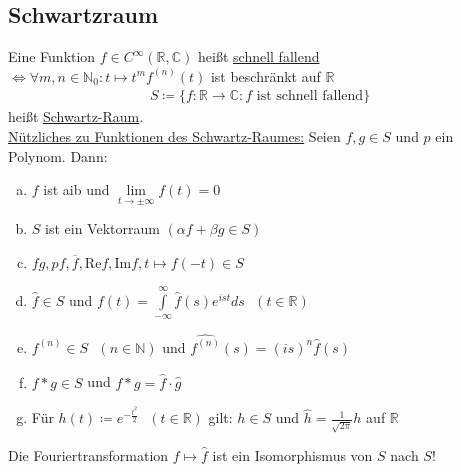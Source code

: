 \documentclass{article}
\newcommand{\cRe}{\text{Re}}
\newcommand{\cIm}{\text{Im}}
\begin{document}
\subsection{Schwartzraum}
Eine Funktion $f \in C^\infty(\mathbb{R},\mathbb{C})$ heißt \underline{schnell fallend} $\Leftrightarrow \forall m,n \in \mathbb{N}_0: t \mapsto t^mf^{(n)}(t)$ ist beschränkt auf $\mathbb{R}$
\begin{align*}
    S \coloneqq \{ f:\mathbb{R} \to \mathbb{C}: f \text{ ist schnell fallend}\}
\end{align*}
heißt \underline{Schwartz-Raum}. \\
\underline{Nützliches zu Funktionen des Schwartz-Raumes:}
Seien $f,g \in S$ und $p$ ein Polynom. Dann:
\begin{enumerate} [a)]
    \item $f$ ist aib und $\lim \limits_{t \to \pm \infty} f(t) = 0$
    \item $S$ ist ein Vektorraum $(\alpha f + \beta g \in S)$
    \item $fg,pf,\overline{f},\cRe f,\cIm f,t \mapsto f(-t) \in S$
    \item $\widehat{f} \in S$ und $f(t)= \int \limits_{-\infty}^\infty \widehat{f}(s)e^{ist}ds \text{ } (t \in \mathbb{R})$
    \item $f^{(n)} \in S \text{ } (n \in \mathbb{N})$ und $\widehat{f^{(n)}}(s) = (is)^n \widehat{f}(s)$
    \item $f*g \in S$ und $\widehat{f*g} = \widehat{f} \cdot \widehat{g}$
    \item Für $h(t) \coloneqq e^{-\frac{t^2}{2}} \text{ } (t \in \mathbb{R})$ gilt: $h \in S$ und $\widehat{h}= \frac{1}{\sqrt{2\pi}}h$ auf $\mathbb{R}$
\end{enumerate}
Die Fouriertransformation $f \mapsto \widehat{f}$ ist ein Isomorphismus von $S$ nach $S$!
\end{document}

